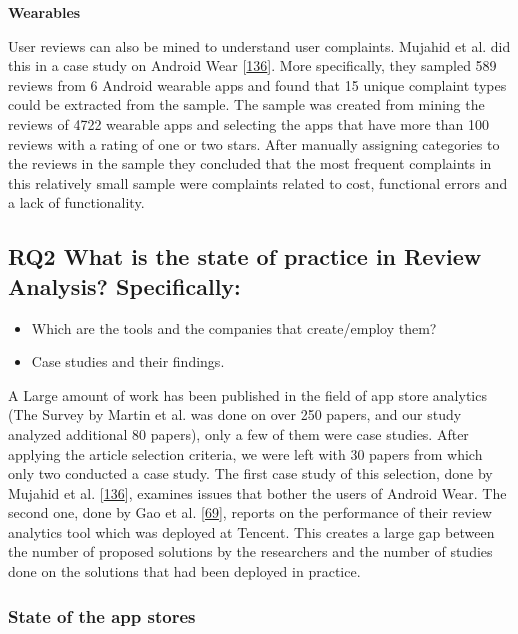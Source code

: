 \documentclass[]{book}
\providecommand{\tightlist}{%
  \setlength{\itemsep}{0pt}\setlength{\parskip}{0pt}}
\begin{document}
\textbf{Wearables}

User reviews can also be mined to understand user complaints. Mujahid et
al. did this in a case study on Android Wear
{[}\protect\hyperlink{ref-mujahid2017examining}{136}{]}. More
specifically, they sampled 589 reviews from 6 Android wearable apps and
found that 15 unique complaint types could be extracted from the sample.
The sample was created from mining the reviews of 4722 wearable apps and
selecting the apps that have more than 100 reviews with a rating of one
or two stars. After manually assigning categories to the reviews in the
sample they concluded that the most frequent complaints in this
relatively small sample were complaints related to cost, functional
errors and a lack of functionality.

\subsection{\texorpdfstring{\textbf{RQ2} What is the state of practice
in Review Analysis?
Specifically:}{RQ2 What is the state of practice in Review Analysis? Specifically:}}\label{rq2-what-is-the-state-of-practice-in-review-analysis-specifically}

\begin{itemize}
\tightlist
\item
  Which are the tools and the companies that create/employ them?
\item
  Case studies and their findings.
\end{itemize}

A Large amount of work has been published in the field of app store
analytics (The Survey by Martin et al. was done on over 250 papers, and
our study analyzed additional 80 papers), only a few of them were case
studies. After applying the article selection criteria, we were left
with 30 papers from which only two conducted a case study. The first
case study of this selection, done by Mujahid et al.
{[}\protect\hyperlink{ref-mujahid2017examining}{136}{]}, examines issues
that bother the users of Android Wear. The second one, done by Gao et
al. {[}\protect\hyperlink{ref-gao2018online}{69}{]}, reports on the
performance of their review analytics tool which was deployed at
Tencent. This creates a large gap between the number of proposed
solutions by the researchers and the number of studies done on the
solutions that had been deployed in practice.

\subsubsection{State of the app stores}\label{state-of-the-app-stores}
\end{document}
